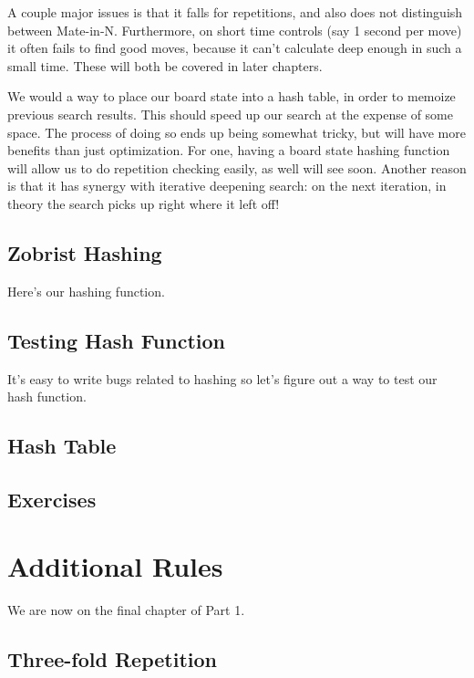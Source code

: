 \documentclass[letterpaper,11pt]{article}
\begin{document}
A couple major issues is that it falls for repetitions, and also does not distinguish between Mate-in-N. Furthermore, on short time controls (say 1 second per move) it often fails to find good moves, because it can't calculate deep enough in such a small time. These will both be covered in later chapters.

We would a way to place our board state into a hash table, in order to memoize previous search results. This should speed up our search at the expense of some space.
The process of doing so ends up being somewhat tricky, but will have more benefits than just optimization. For one, having a board state hashing function 
will allow us to do repetition checking easily, as well will see soon. Another reason is that it has synergy with iterative deepening search: on the next iteration, in theory the search picks up right where it left off!

\subsection{Zobrist Hashing}

Here's our hashing function.

\subsection{Testing Hash Function}

It's easy to write bugs related to hashing so let's figure out a way to test our hash function.

\subsection{Hash Table}

\subsection{Exercises}

\section{Additional Rules}

We are now on the final chapter of Part 1.

\subsection{Three-fold Repetition}
\end{document}
